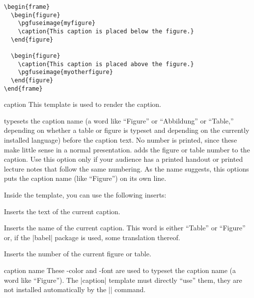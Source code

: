 \example
\begin{verbatim}
\begin{frame}
  \begin{figure}
    \pgfuseimage{myfigure}
    \caption{This caption is placed below the figure.}
  \end{figure}

  \begin{figure}
    \caption{This caption is placed above the figure.}
    \pgfuseimage{myotherfigure}
  \end{figure}
\end{frame}
\end{verbatim}

\begin{element}{caption}\yes\yes\yes
  This template is used to render the caption.
  \begin{templateoptions}
    typesets the caption name (a word like ``Figure'' or ``Abbildung'' or ``Table,'' depending on whether a table or figure is typeset and depending on the currently installed language) before the caption text. No number is printed, since these make little sense in a normal presentation.
    adds the figure or table number to the caption. Use this option only if your audience has a printed handout or printed lecture notes that follow the same numbering.
    As the name suggests, this options puts the caption name (like ``Figure'') on its own line.
  \end{templateoptions}

  Inside the template, you can use the following inserts:
  \begin{itemize}
    \iteminsert{\insertcaption}
    Inserts the text of the current caption.

    \iteminsert{\insertcaptionname}
    Inserts the name of the current caption. This word is either ``Table'' or ``Figure'' or, if the |babel| package is used, some translation thereof.

    \iteminsert{\insertcaptionnumber}
    Inserts the number of the current figure or table.
  \end{itemize}
\end{element}

\begin{element}{caption name}\no\yes\yes
  These \beamer-color and -font are used to typeset the caption name (a word like ``Figure''). The |caption| template must directly ``use'' them, they are not installed automatically by the |\insertcaptionname| command.
\end{element}


